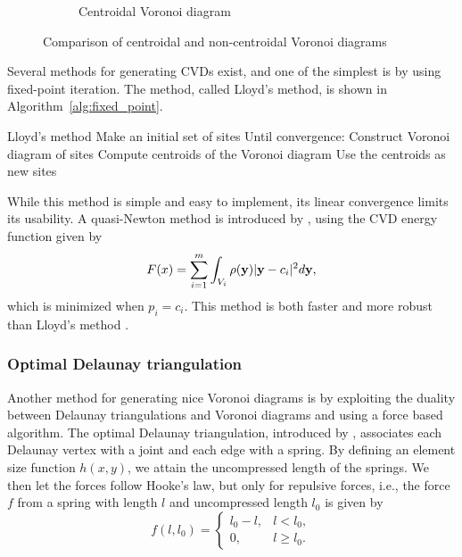 \begin{figure}[ht]
\begin{subfigure}[b]{0.4\textwidth}
        \caption{Centroidal Voronoi diagram}
        \label{fig:CVD}
    \end{subfigure}
    \caption{Comparison of centroidal and non-centroidal Voronoi diagrams}
    \label{fig:CVD_comparison}
\end{figure}

Several methods for generating CVDs exist, and one of the simplest is by using fixed-point iteration. The method, called Lloyd's method, is shown in Algorithm~\ref{alg:fixed_point}.

\begin{pseudocode}[label=alg:fixed_point]{Lloyd's method}
    Make an initial set of sites
    Until convergence:
        Construct Voronoi diagram of sites
        Compute centroids of the Voronoi diagram
        Use the centroids as new sites
\end{pseudocode}

While this method is simple and easy to implement, its linear convergence limits its usability. A quasi-Newton method is introduced by \textcite{CVDmethods}, using the CVD energy function given by
\begin{equation}
    F(x) = \sum_{i=1}^m \int_{V_i} \rho(\mathbf{y}) \lvert\mathbf{y} - c_i\rvert^2 d\mathbf{y},
\end{equation}
which is minimized when $p_i = c_i$. This method is both faster and more robust than Lloyd's method \cite{CVDmethods}.

\subsubsection{Optimal Delaunay triangulation}
\label{sec:optimal-delaunay}
Another method for generating nice Voronoi diagrams is by exploiting the duality between Delaunay triangulations and Voronoi diagrams and using a force based algorithm. The optimal Delaunay triangulation, introduced by \textcite{Distmesh}, associates each Delaunay vertex with a joint and each edge with a spring. By defining an element size function $h(x, y)$, we attain the uncompressed length of the springs. We then let the forces follow Hooke's law, but only for repulsive forces, i.e., the force $f$ from a spring with length $l$ and uncompressed length $l_0$ is given by
\begin{equation}
    \label{eq:delaunay_force}
    f(l, l_0) = \begin{cases}
        l_0 - l, & l < l_0, \\
        0, & l \ge l_0.
    \end{cases}
\end{equation}

